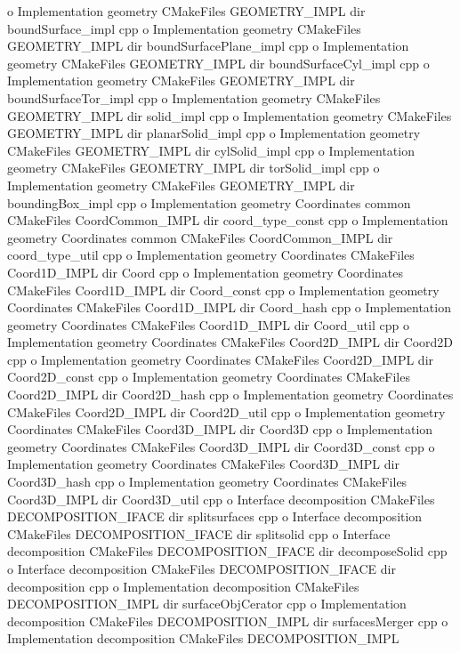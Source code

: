 o Implementation geometry C\+Make\+Files G\+E\+O\+M\+E\+T\+R\+Y\+\_\+\+I\+M\+PL dir bound\+Surface\+\_\+impl cpp o Implementation geometry C\+Make\+Files G\+E\+O\+M\+E\+T\+R\+Y\+\_\+\+I\+M\+PL dir bound\+Surface\+Plane\+\_\+impl cpp o Implementation geometry C\+Make\+Files G\+E\+O\+M\+E\+T\+R\+Y\+\_\+\+I\+M\+PL dir bound\+Surface\+Cyl\+\_\+impl cpp o Implementation geometry C\+Make\+Files G\+E\+O\+M\+E\+T\+R\+Y\+\_\+\+I\+M\+PL dir bound\+Surface\+Tor\+\_\+impl cpp o Implementation geometry C\+Make\+Files G\+E\+O\+M\+E\+T\+R\+Y\+\_\+\+I\+M\+PL dir solid\+\_\+impl cpp o Implementation geometry C\+Make\+Files G\+E\+O\+M\+E\+T\+R\+Y\+\_\+\+I\+M\+PL dir planar\+Solid\+\_\+impl cpp o Implementation geometry C\+Make\+Files G\+E\+O\+M\+E\+T\+R\+Y\+\_\+\+I\+M\+PL dir cyl\+Solid\+\_\+impl cpp o Implementation geometry C\+Make\+Files G\+E\+O\+M\+E\+T\+R\+Y\+\_\+\+I\+M\+PL dir tor\+Solid\+\_\+impl cpp o Implementation geometry C\+Make\+Files G\+E\+O\+M\+E\+T\+R\+Y\+\_\+\+I\+M\+PL dir bounding\+Box\+\_\+impl cpp o Implementation geometry Coordinates common C\+Make\+Files Coord\+Common\+\_\+\+I\+M\+PL dir coord\+\_\+type\+\_\+const cpp o Implementation geometry Coordinates common C\+Make\+Files Coord\+Common\+\_\+\+I\+M\+PL dir coord\+\_\+type\+\_\+util cpp o Implementation geometry Coordinates C\+Make\+Files Coord1\+D\+\_\+\+I\+M\+PL dir Coord cpp o Implementation geometry Coordinates C\+Make\+Files Coord1\+D\+\_\+\+I\+M\+PL dir Coord\+\_\+const cpp o Implementation geometry Coordinates C\+Make\+Files Coord1\+D\+\_\+\+I\+M\+PL dir Coord\+\_\+hash cpp o Implementation geometry Coordinates C\+Make\+Files Coord1\+D\+\_\+\+I\+M\+PL dir Coord\+\_\+util cpp o Implementation geometry Coordinates C\+Make\+Files Coord2\+D\+\_\+\+I\+M\+PL dir Coord2D cpp o Implementation geometry Coordinates C\+Make\+Files Coord2\+D\+\_\+\+I\+M\+PL dir Coord2\+D\+\_\+const cpp o Implementation geometry Coordinates C\+Make\+Files Coord2\+D\+\_\+\+I\+M\+PL dir Coord2\+D\+\_\+hash cpp o Implementation geometry Coordinates C\+Make\+Files Coord2\+D\+\_\+\+I\+M\+PL dir Coord2\+D\+\_\+util cpp o Implementation geometry Coordinates C\+Make\+Files Coord3\+D\+\_\+\+I\+M\+PL dir Coord3D cpp o Implementation geometry Coordinates C\+Make\+Files Coord3\+D\+\_\+\+I\+M\+PL dir Coord3\+D\+\_\+const cpp o Implementation geometry Coordinates C\+Make\+Files Coord3\+D\+\_\+\+I\+M\+PL dir Coord3\+D\+\_\+hash cpp o Implementation geometry Coordinates C\+Make\+Files Coord3\+D\+\_\+\+I\+M\+PL dir Coord3\+D\+\_\+util cpp o Interface decomposition C\+Make\+Files D\+E\+C\+O\+M\+P\+O\+S\+I\+T\+I\+O\+N\+\_\+\+I\+F\+A\+CE dir splitsurfaces cpp o Interface decomposition C\+Make\+Files D\+E\+C\+O\+M\+P\+O\+S\+I\+T\+I\+O\+N\+\_\+\+I\+F\+A\+CE dir splitsolid cpp o Interface decomposition C\+Make\+Files D\+E\+C\+O\+M\+P\+O\+S\+I\+T\+I\+O\+N\+\_\+\+I\+F\+A\+CE dir decompose\+Solid cpp o Interface decomposition C\+Make\+Files D\+E\+C\+O\+M\+P\+O\+S\+I\+T\+I\+O\+N\+\_\+\+I\+F\+A\+CE dir decomposition cpp o Implementation decomposition C\+Make\+Files D\+E\+C\+O\+M\+P\+O\+S\+I\+T\+I\+O\+N\+\_\+\+I\+M\+PL dir surface\+Obj\+Cerator cpp o Implementation decomposition C\+Make\+Files D\+E\+C\+O\+M\+P\+O\+S\+I\+T\+I\+O\+N\+\_\+\+I\+M\+PL dir surfaces\+Merger cpp o Implementation decomposition C\+Make\+Files D\+E\+C\+O\+M\+P\+O\+S\+I\+T\+I\+O\+N\+\_\+\+I\+M\+PL 